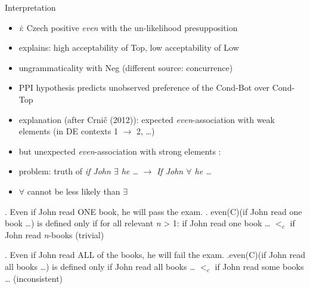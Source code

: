 \documentclass[ignorenonframetext,]{beamer}
\providecommand{\tightlist}{%
  \setlength{\itemsep}{0pt}\setlength{\parskip}{0pt}}
\begin{document}
\begin{frame}{Interpretation}

\begin{itemize}
\tightlist
\item
  \emph{i}: Czech positive \emph{even} with the un-likelihood
  presupposition
\item
  explains: high acceptability of Top, low acceptability of Low
\item
  ungrammaticality with Neg (different source: concurrence)
\item
  PPI hypothesis predicts unobserved preference of the Cond-Bot over
  Cond-Top
\end{itemize}

\end{frame}

\begin{frame}

\begin{itemize}
\tightlist
\item
  explanation (after Crnič (2012)): expected \emph{even}-association
  with weak elements \Next (in DE contexts 1 \(\rightarrow\) 2,
  \ldots{})
\item
  but unexpected \emph{even}-association with strong elements \NNext:
\item
  problem: truth of \emph{if John \(\exists\) he \ldots{}}
  \(\rightarrow\) \emph{If John \(\forall\) he \ldots{}}
\item
  \(\forall\) cannot be less likely than \(\exists\)
\end{itemize}

\ex. Even if John read ONE book, he will pass the exam. \a. even(C)(if
John read one book \ldots{}) is defined only if for all relevant
\emph{n} \textgreater{} 1: if John read one book \ldots{} \(<_c\) if
John read \emph{n}-books \hfill (trivial)

\ex. Even if John read ALL of the books, he will fail the exam.
\a.even(C)(if John read all books \ldots{}) is defined only if John read
all books \ldots{} \(<_c\) if John read some books \ldots{}
\hfill (inconsistent)

\end{frame}
\end{document}
